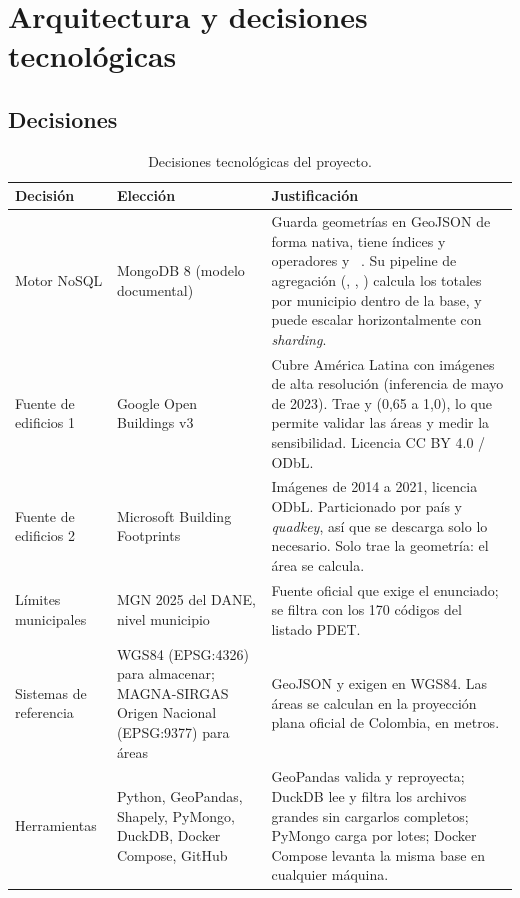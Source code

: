 \section{Arquitectura y decisiones tecnológicas}
\label{sec:arquitectura}

\subsection{Decisiones}

\begin{table}[H]
\centering\small
\caption{Decisiones tecnológicas del proyecto.}
\label{tab:decisiones}
\begin{tabularx}{\textwidth}{@{}p{2.6cm}p{3.6cm}L@{}}
\toprule
\textbf{Decisión} & \textbf{Elección} & \textbf{Justificación} \\
\midrule
Motor NoSQL & MongoDB 8 (modelo documental) &
  Guarda geometrías en GeoJSON de forma nativa, tiene índices 
  y operadores  y ~\cite{mongodb}.
  Su pipeline de agregación (, ,
  ) calcula los totales por municipio dentro de la base, y
  puede escalar horizontalmente con \emph{sharding}. \\
Fuente de edificios 1 & Google Open Buildings v3 &
  Cubre América Latina con imágenes de alta resolución (inferencia de mayo
  de 2023). Trae  y  (0,65 a 1,0),
  lo que permite validar las áreas y medir la sensibilidad. Licencia
  CC BY 4.0 / ODbL. \\
Fuente de edificios 2 & Microsoft Building Footprints &
  Imágenes de 2014 a 2021, licencia ODbL. Particionado por país y
  \emph{quadkey}, así que se descarga solo lo necesario. Solo trae la
  geometría: el área se calcula. \\
Límites municipales & MGN 2025 del DANE, nivel municipio &
  Fuente oficial que exige el enunciado; se filtra con los 170 códigos del
  listado PDET. \\
Sistemas de referencia & WGS84 (EPSG:4326) para almacenar; MAGNA-SIRGAS
  Origen Nacional (EPSG:9377) para áreas &
  GeoJSON y  exigen  en WGS84. Las
  áreas se calculan en la proyección plana oficial de Colombia, en metros. \\
Herramientas & Python, GeoPandas, Shapely, PyMongo, DuckDB, Docker Compose,
  GitHub &
  GeoPandas valida y reproyecta; DuckDB lee y filtra los archivos grandes sin
  cargarlos completos; PyMongo carga por lotes; Docker Compose levanta la
  misma base en cualquier máquina. \\
\bottomrule
\end{tabularx}
\end{table}

